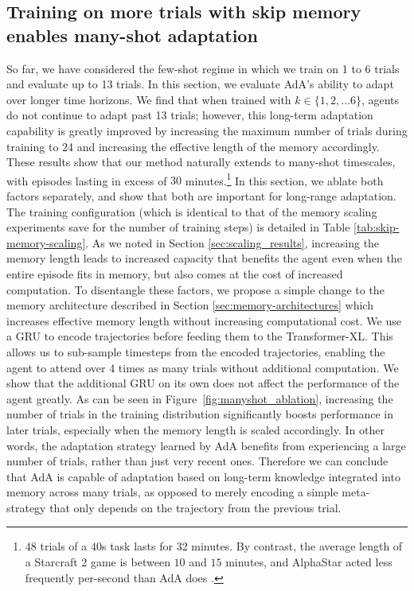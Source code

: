 \documentclass[11pt, a4paper, logo, copyright]{deepmind}
\begin{document}
\subsection{Training on more trials with skip memory enables many-shot adaptation} \label{sec:results_few_to_many_shot}
So far, we have considered the few-shot regime in which we train on 1 to 6 trials and evaluate up to 13 trials. In this section, we evaluate AdA's ability to adapt over longer time horizons. We find that when trained with $k \in \{1, 2, \dots 6\}$, agents do not continue to adapt past 13 trials; however, this long-term adaptation capability is greatly improved by increasing the maximum number of trials during training to 24 and increasing the effective length of the memory accordingly. These results show that our method naturally extends to many-shot timescales, with episodes lasting in excess of $30$ minutes.\footnote{$48$ trials of a $40$s task lasts for 32 minutes. By contrast, the average length of a Starcraft 2 game is between $10$ and $15$ minutes, and AlphaStar acted less frequently per-second than AdA does \citep{alphastar}.} In this section, we ablate both factors separately, and show that both are important for long-range adaptation. The training configuration (which is identical to that of the memory scaling experiments save for the number of training steps) is detailed in Table \ref{tab:skip-memory-scaling}.
As we noted in Section \ref{sec:scaling_results}, increasing the memory length leads to increased capacity that benefits the agent even when the entire episode fits in memory, but also comes at the cost of increased computation. To disentangle these factors, we propose a simple change to the memory architecture described in Section \ref{sec:memory-architectures} which increases effective memory length without increasing computational cost. We use a GRU to encode trajectories before feeding them to the Transformer-XL. This allows us to sub-sample timesteps from the encoded trajectories, enabling the agent to attend over 4 times as many trials without additional computation. We show that the additional GRU on its own does not affect the performance of the agent greatly.
As can be seen in Figure~\ref{fig:manyshot_ablation}, increasing the number of trials in the training distribution significantly boosts performance in later trials, especially when the memory length is scaled accordingly. In other words, the adaptation strategy learned by AdA benefits from experiencing a large number of trials, rather than just very recent ones. Therefore we can conclude that AdA is capable of adaptation based on long-term knowledge integrated into memory across many trials, as opposed to merely encoding a simple meta-strategy that only depends on the trajectory from the previous trial.
\end{document}

